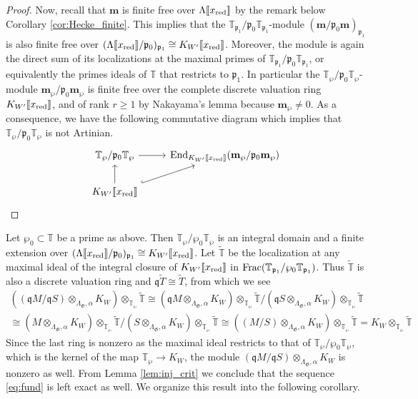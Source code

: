 \documentclass[leqno]{amsart}
\theoremstyle{definition}
\theoremstyle{remark}
\DeclareMathOperator{\End}{End}
\newcommand{\fp}{\mathfrak{p}}
\newcommand{\fq}{\mathfrak{q}}
\newcommand{\xx}{x_\textnormal{red}}
\newcommand{\fG}{\mathfrak{G}}
\newcommand{\TT}{\mathbb{T}} %
\begin{document}
\begin{proof}
Now, recall that
$\mathbf{m}$ is finite free over
$\Lambda\llbracket\xx\rrbracket$
by the remark below Corollary \ref{cor:Hecke_finite}.
This implies that the
$\TT_{\fp_1}/\fp_0\TT_{\fp_1}$-module
$(\mathbf{m}/\fp_0\mathbf{m})_{\fp_1}$
is also finite free over 
$(\Lambda\llbracket\xx\rrbracket/\fp_0)_{\fp_1}
\cong K_{W'}\llbracket \xx\rrbracket$.
Moreover, the module is again 
the direct sum of its localizations
at the maximal primes of
$\TT_{\fp_1}/\fp_0\TT_{\fp_1}$,
or equivalently the primes ideals of $\TT$
that restricts to $\fp_1$.
In particular the
$\TT_{\wp}/\fp_0\TT_{\wp}$-module
$\mathbf{m}_{\wp}/\fp_0\mathbf{m}_{\wp}$
is finite free over the complete discrete valuation ring
$K_{W'}\llbracket \xx\rrbracket$,
and of rank $r\geq 1$
by Nakayama's lemma because $\mathbf{m}_\wp\neq 0$.
As a consequence, we have the following commutative diagram
which implies that 
$\TT_{\wp}/\fp_0\TT_{\wp}$ is not Artinian.
\[
\begin{tikzcd}
\TT_{\wp}/\fp_0\TT_{\wp}\arrow[r]&
\End_{K_{W'}\llbracket\xx\rrbracket}
(\mathbf{m}_\wp/\fp_0\mathbf{m}_\wp)\\
K_{W'}\llbracket\xx\rrbracket
\arrow[u]\arrow[ur,hookrightarrow]
\end{tikzcd}
\]
\end{proof}

Let $\wp_0\subset \TT$ be a prime as above.
Then $\TT_{\wp}/\wp_0\TT_{\wp}$
is an integral domain and a finite extension
over $(\Lambda\llbracket\xx\rrbracket/\fp_0)_{\fp_1}\cong 
K_{W'}\llbracket\xx\rrbracket$.
Let $\tilde{\TT}$ be the localization
at any maximal ideal 
of the integral closure of
$K_{W'}\llbracket\xx\rrbracket$
in $\textnormal{Frac}(\TT_{\fp_1}/\wp_0\TT_{\fp_1})$.
Thus $\tilde{\TT}$ is also 
a discrete valuation ring
and $\fq\tilde{T}\cong \tilde{T}$,
from which we see 
\begin{multline*}
((\fq M/\fq S)\otimes_{\Lambda_\fG,\alpha} K_W)
\otimes_{\TT_\wp}\tilde{\TT}\cong 
(\fq M\otimes_{\Lambda_\fG,\alpha} K_W)
\otimes_{\TT_\wp}\tilde{\TT}/
(\fq S\otimes_{\Lambda_\fG,\alpha} K_W)
\otimes_{\TT_\wp}\tilde{\TT}\\\cong
(M\otimes_{\Lambda_\fG,\alpha} K_W)
\otimes_{\TT_\wp}\tilde{\TT}/
(S\otimes_{\Lambda_\fG,\alpha} K_W)
\otimes_{\TT_\wp}\tilde{\TT}\cong
((M/S)\otimes_{\Lambda_\fG,\alpha} K_W)
\otimes_{\TT_\wp}\tilde{\TT}=
K_W \otimes_{\TT_\wp}\tilde{\TT}
\end{multline*}
Since the last ring is nonzero
as the maximal ideal 
restricts to that of 
$\TT_{\wp}/\wp_0\TT_{\wp}$,
which is the kernel of the map
$\TT_\wp\to K_W$,
the module 
$(\fq M/\fq S)\otimes_{\Lambda_\fG,\alpha} K_W$
is nonzero as well.
From Lemma \eqref{lem:inj_crit}
we conclude that 
the sequence \eqref{eq:fund} is left exact as well.
We organize this result into the following corollary.
\end{document}
